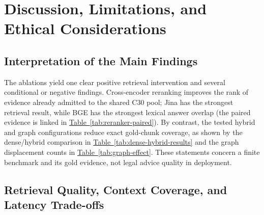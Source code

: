 \section{Discussion, Limitations, and Ethical Considerations}
\label{sec:discussion-limitations-ethics}

\subsection{Interpretation of the Main Findings}
\label{sec:interpretation-main-findings}

The ablations yield one clear positive retrieval intervention and several
conditional or negative findings. Cross-encoder reranking improves the rank of
evidence already admitted to the shared C30 pool; Jina has the strongest
retrieval result, while BGE has the strongest lexical answer overlap (the
paired evidence is linked in
\hyperref[tab:reranker-paired]{Table~\ref*{tab:reranker-paired}}). By
contrast, the tested hybrid and graph configurations reduce exact gold-chunk
coverage, as shown by the dense/hybrid comparison in
\hyperref[tab:dense-hybrid-results]{Table~\ref*{tab:dense-hybrid-results}} and
the graph displacement counts in
\hyperref[tab:graph-effect]{Table~\ref*{tab:graph-effect}}. These statements
concern a finite benchmark and its gold evidence, not legal advice quality in
deployment.

\subsection{Retrieval Quality, Context Coverage, and Latency Trade-offs}
\label{sec:retrieval-quality-tradeoffs}

